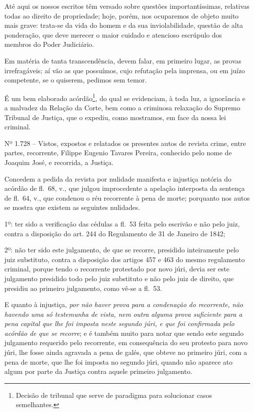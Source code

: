 Até aqui os nossos escritos têm versado sobre questões importantíssimas,
relativas todas ao direito de propriedade; hoje, porém, nos ocuparemos
de objeto muito mais grave: trata-se da vida do homem e da sua
inviolabilidade, questão de alta ponderação, que deve merecer o maior
cuidado e atencioso escrúpulo dos membros do Poder Judiciário.

Em matéria de tanta transcendência, devem falar, em primeiro lugar, as
provas irrefragáveis; aí vão as que possuímos, cujo refutação pela
imprensa, ou em juízo competente, se o quiserem, pedimos sem temor.

É um bem elaborado acórdão\footnote{Decisão de tribunal que serve de
  paradigma para solucionar casos semelhantes.}, do qual se evidenciam,
à toda luz, a ignorância e a malvadez da Relação da Corte, bem como a
criminosa relaxação do Supremo Tribunal de Justiça, que o expediu, como
mostramos, em face da nossa lei criminal.

Nº 1.728 -- Vistos, expostos e relatados os presentes autos de revista
crime, entre partes, recorrente, Filippe Eugenio Tavares Pereira,
conhecido pelo nome de Joaquim José, e recorrida, a Justiça.

Concedem a pedida da revista por nulidade manifesta e injustiça notória
do acórdão de fl.~68, v., que julgou improcedente a apelação interposta
da sentença de fl.~64, v., que condenou o réu recorrente à pena de
morte; porquanto nos autos se mostra que existem as seguintes nulidades.

1º: ter sido a verificação das cédulas a fl.~53 feita pelo escrivão e
não pelo juiz, contra a disposição do art. 244 do Regulamento de 31 de
Janeiro de 1842;

2º: não ter sido este julgamento, de que se recorre, presidido
inteiramente pelo juiz substituto, contra a disposição dos artigos 457 e
463 do mesmo regulamento criminal, porque tendo o recorrente protestado
por novo júri, devia ser este julgamento presidido todo pelo juiz
substituto e não pelo juiz de direito, que presidiu ao primeiro
julgamento, como vê-se a fl.~53.

E quanto à injustiça, \emph{por não haver prova para a condenação do
recorrente, não havendo uma só testemunha de vista, nem outra alguma
prova suficiente para a pena capital que lhe foi imposta neste segundo
júri, e que foi confirmada pelo acórdão de que se recorre}; e é também
muito para notar que sendo este segundo julgamento requerido pelo
recorrente, em consequência do seu protesto para novo júri, lhe fosse
ainda agravada a pena de galés, que obteve no primeiro júri, com a pena
de morte, que lhe foi imposta no segundo júri, quando não aparece ato
algum por parte da Justiça contra aquele primeiro julgamento.

